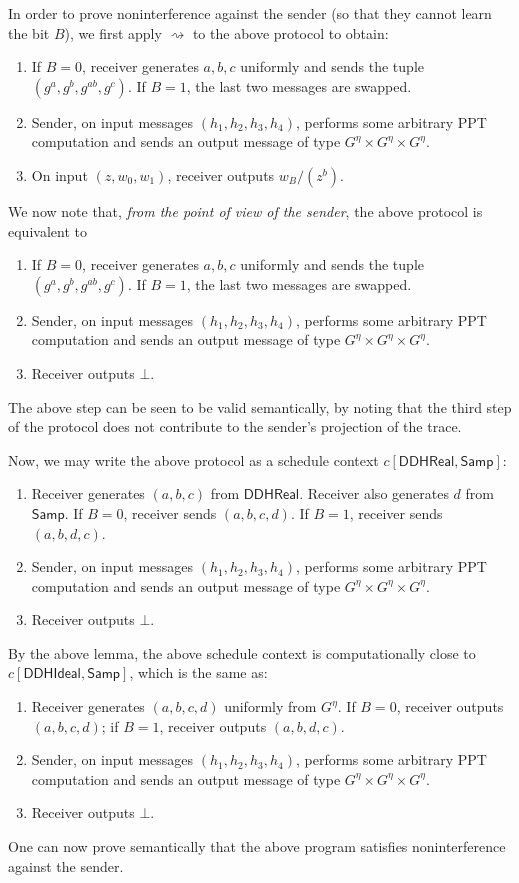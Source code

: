 \documentclass{article}
\begin{document}
In order to prove noninterference against the sender (so that they cannot learn the bit $B$), we first apply $\rightsquigarrow$ to the above protocol to obtain:
\begin{enumerate}
    \item If $B=0$, receiver generates $a,b,c$ uniformly and sends the tuple $(g^a, g^b, g^{ab}, g^c)$. If $B=1$, the last two messages are swapped.
    \item Sender, on input messages $(h_1, h_2, h_3, h_4)$, performs some arbitrary PPT computation and sends an output message of type $G^\eta \times G^\eta \times G^\eta$.
    \item On input $(z, w_0, w_1)$, receiver outputs $w_B / (z^b)$.
\end{enumerate}

We now note that, \emph{from the point of view of the sender}, the above protocol is equivalent to
\begin{enumerate}
    \item If $B=0$, receiver generates $a,b,c$ uniformly and sends the tuple $(g^a, g^b, g^{ab}, g^c)$. If $B=1$, the last two messages are swapped.
    \item Sender, on input messages $(h_1, h_2, h_3, h_4)$, performs some arbitrary PPT computation and sends an output message of type $G^\eta \times G^\eta \times G^\eta$.
    \item Receiver outputs $\bot$.
\end{enumerate}

The above step can be seen to be valid semantically, by noting that the third step of the protocol does not contribute to the sender's projection of the trace.

Now, we may write the above protocol as a schedule context $c[\textsf{DDHReal}, \textsf{Samp}]$:
\begin{enumerate}
    \item Receiver generates $(a,b,c)$ from $\textsf{DDHReal}$. Receiver also generates $d$ from $\textsf{Samp}$. If $B=0$, receiver sends $(a,b,c,d)$. If $B=1$, receiver sends $(a,b,d,c)$. 
    \item Sender, on input messages $(h_1, h_2, h_3, h_4)$, performs some arbitrary PPT computation and sends an output message of type $G^\eta \times G^\eta \times G^\eta$.
    \item Receiver outputs $\bot$.
\end{enumerate}

By the above lemma, the above schedule context is computationally close to $c[\textsf{DDHIdeal}, \textsf{Samp}]$, which is the same as:
\begin{enumerate}
    \item Receiver generates $(a,b,c,d)$ uniformly from $G^\eta$. If $B=0$, receiver outputs $(a,b,c,d)$; if $B=1$, receiver outputs $(a,b,d,c)$.
    \item Sender, on input messages $(h_1, h_2, h_3, h_4)$, performs some arbitrary PPT computation and sends an output message of type $G^\eta \times G^\eta \times G^\eta$.
    \item Receiver outputs $\bot$.
\end{enumerate}

One can now prove semantically that the above program satisfies noninterference against the sender. 
\end{document}
